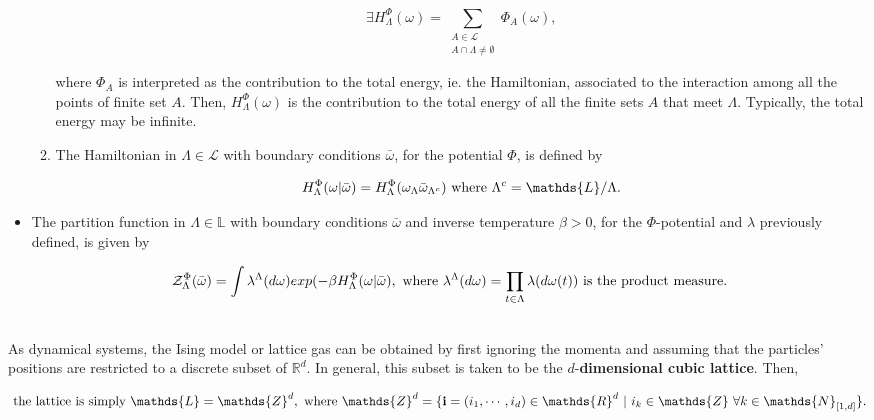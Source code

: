 \documentclass{homework}
\begin{document}
\begin{itemize}
\begin{enumerate}
        $$
        \exists H_{\Lambda}^{\Phi}(\omega) = \sum_{\substack{A \in \mathcal{L} \\
              A \cap \Lambda \neq \emptyset}} \Phi_A (\omega),
        $$
        
        where $\Phi_A$ is interpreted as the contribution to the total energy, ie. the Hamiltonian, associated to the interaction among all the points of finite set $A$. Then, $H_{\Lambda}^{\Phi}(\omega)$ is the contribution to the total energy of all the finite sets $A$ that meet $\Lambda$. Typically, the total energy may be infinite. \\
    
    \item The Hamiltonian in $\Lambda \in \mathcal{L}$ with boundary conditions $\bar \omega$, for the potential $\Phi$, is defined by 
    
    $$
     H_{\Lambda}^{\Phi}(\omega | \bar{\omega}) =  H_{\Lambda}^{\Phi}(\omega_{\Lambda} \bar{\omega}_{\Lambda^c}) \textnormal{    where   } \Lambda^c = \mathds{L} / \Lambda.
    $$
    \end{enumerate}
    
    \item The partition function in $\Lambda \in \mathds{L}$ with boundary conditions $\bar \omega$ and inverse temperature $\beta > 0$, for the $\Phi$-potential and $\lambda$ previously defined, is given by 
    
    \begin{equation*}
        \mathcal{Z}_{\Lambda}^{\Phi}(\bar{\omega}) = \int \lambda^{\Lambda}(d\omega) exp(-\beta   H_{\Lambda}^{\Phi}(\omega | \bar{\omega} ), \textnormal{ where } \lambda^\Lambda(d\omega) = \prod_{t\in\Lambda} \lambda(d\omega(t)) \textnormal{ is the product measure}.
    \end{equation*}
\end{itemize}

\blanky \\

As dynamical systems, the Ising model or lattice gas can be obtained by first ignoring the momenta and assuming that the particles' positions are restricted to a discrete subset of $\mathds{R}^d$. In general, this subset is taken to be the $d$-\textbf{dimensional cubic lattice}. Then,

\begin{equation}
    \textnormal{ the lattice is simply } \mathds{L} = \mathds{Z}^d, \textnormal{ where }
    \mathds{Z}^d = \{{\bf i} = (i_1, \cdots, i_d) \in \mathds{R}^d \blanky  |  \blanky i_k \in \mathds{Z} \blanky \forall k \in \mathds{N}_{[1, d]}\}.
\end{equation}
\end{document}
